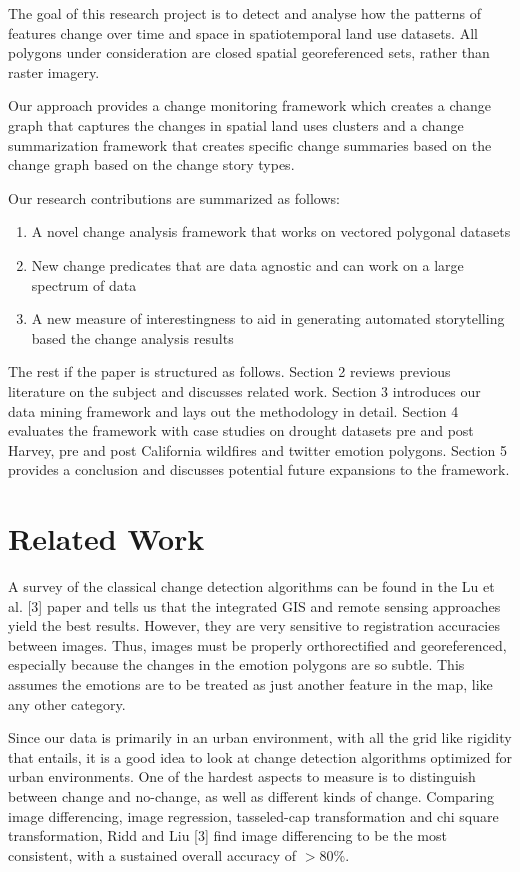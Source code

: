 \documentclass[conference]{IEEEtran}
\begin{document}
The goal of this research project is to detect and analyse how the patterns of features change over time and space in spatiotemporal land use datasets. All polygons under consideration are closed spatial  georeferenced sets, rather than raster imagery.

Our approach provides a change monitoring framework which creates a change graph that captures the changes in spatial land uses clusters and a change summarization framework that creates specific change summaries based on the change graph based on the change story types. 

Our research contributions are summarized as follows:

\begin{enumerate}
 \item A novel change analysis framework that works on vectored polygonal datasets
 \item New change predicates that are data agnostic and can work on a large spectrum of data
 \item A new measure of interestingness to aid in generating automated storytelling based the change analysis results
\end{enumerate}

The rest if the paper is structured as follows. Section 2 reviews previous literature on the subject and discusses related work.  Section 3 introduces our data mining framework and lays out the methodology in detail. Section 4 evaluates the framework with case studies on drought datasets pre and post Harvey, pre and post California wildfires and twitter emotion polygons. Section 5 provides a conclusion and discusses potential future expansions to the framework.


\section{Related Work}

A survey of the classical change detection algorithms can be found in the Lu et al. [3] paper and tells us that the integrated GIS and remote sensing approaches yield the best results. However, they are very sensitive to registration accuracies between images. Thus, images must be properly orthorectified and georeferenced, especially because the changes in the emotion polygons are so subtle. This assumes the emotions are to be treated as just another feature in the map, like any other category.

Since our data is primarily in an urban environment, with all the grid like rigidity that entails, it is a good idea to look at change detection algorithms optimized for urban environments. One of the hardest aspects to measure is to distinguish between change and no-change, as well as different kinds of change. Comparing image differencing, image regression, tasseled-cap transformation and chi square transformation, Ridd and Liu [3] find image differencing to be the most consistent, with a sustained overall accuracy of 
$>$80\%.
\end{document}
